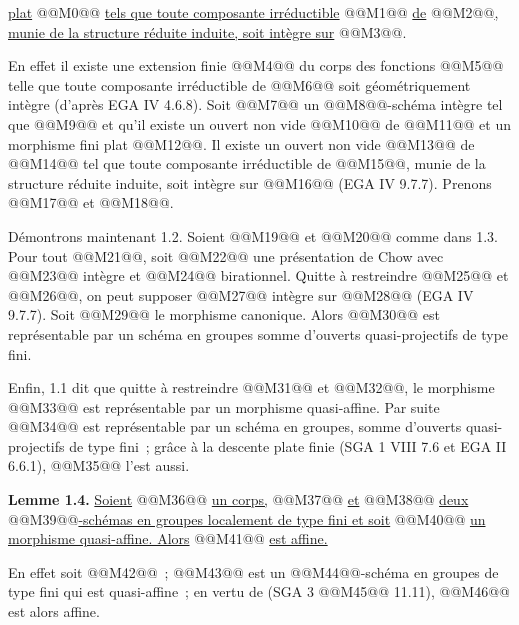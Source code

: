 
\uline{plat} @@M0@@ \uline{tels que toute composante irréductible} @@M1@@ \uline{de} @@M2@@\uline{, munie de la structure réduite induite, soit intègre sur} @@M3@@.

En effet il existe une extension finie @@M4@@ du corps des fonctions @@M5@@ telle que toute composante irréductible de @@M6@@ soit géométriquement intègre (d'après EGA IV 4.6.8). Soit @@M7@@ un @@M8@@-schéma intègre tel que @@M9@@ et qu'il existe un ouvert non vide @@M10@@ de @@M11@@ et un morphisme fini plat @@M12@@. Il existe un ouvert non vide @@M13@@ de @@M14@@ tel que toute composante irréductible de @@M15@@, munie de la structure réduite induite, soit intègre sur @@M16@@ (EGA IV 9.7.7). Prenons @@M17@@ et @@M18@@.

Démontrons maintenant 1.2. Soient @@M19@@ et @@M20@@ comme dans 1.3. Pour tout @@M21@@, soit @@M22@@ une présentation de Chow avec @@M23@@ intègre et @@M24@@ birationnel. Quitte à restreindre @@M25@@ et @@M26@@, on peut supposer @@M27@@ intègre sur @@M28@@ (EGA IV 9.7.7). Soit @@M29@@ le morphisme canonique. Alors @@M30@@ est représentable par un schéma en groupes somme d'ouverts quasi-projectifs de type fini.

Enfin, 1.1 dit que quitte à restreindre @@M31@@ et @@M32@@, le morphisme @@M33@@ est représentable par un morphisme quasi-affine. Par suite @@M34@@ est représentable par un schéma en groupes, somme d'ouverts quasi-projectifs de type fini~; grâce à la descente plate finie (SGA 1 VIII 7.6 et EGA II 6.6.1), @@M35@@ l'est aussi.

\textbf{Lemme 1.4.} \uline{Soient} @@M36@@ \uline{un corps,} @@M37@@ \uline{et} @@M38@@ \uline{deux} @@M39@@\uline{-schémas en groupes localement de type fini et soit} @@M40@@ \uline{un morphisme quasi-affine. Alors} @@M41@@ \uline{est affine.}

En effet soit @@M42@@~; @@M43@@ est un @@M44@@-schéma en groupes de type fini qui est quasi-affine~; en vertu de (SGA 3 @@M45@@ 11.11), @@M46@@ est alors affine.
